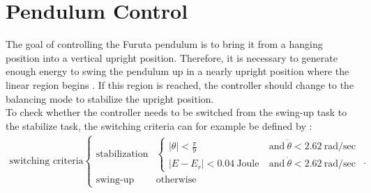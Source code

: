 \section{Pendulum Control}
The goal of controlling the Furuta pendulum is to bring it from a hanging 
position into a vertical upright position. Therefore, it is necessary to 
generate enough energy to swing the pendulum up in a nearly upright position 
where the linear region begins \citep{kurode2011swing}. If this region is 
reached, the controller should change to the balancing mode to stabilize the 
upright position.\\
To check whether the controller needs to be switched from the swing-up task to 
the stabilize task, the switching criteria can for 
example be defined by \citep{hamza2019current}:
\begin{align*}
\text{switching criteria}
\begin{cases} \text{stabilization} &\begin{cases}
|\theta|< \frac{\pi}{9} \ &\text{and}\  \dot{\theta} < 2.62\  \text{rad/sec}\\
|E-E_r|< 0.04 \ \text{Joule}\ &\text{and}\  \dot{\theta} < 2.62\  \text{rad/sec}
\end{cases}\\
\text{swing-up} & \text{otherwise}
\end{cases}.
\end{align*}

